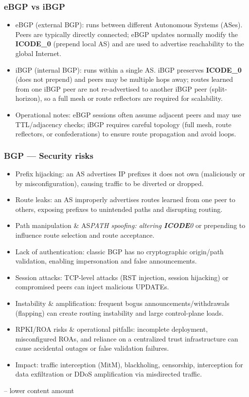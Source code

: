 \documentclass{article}
\begin{document}
\subsubsection{eBGP vs iBGP}
\begin{itemize}
  \item eBGP (external BGP): runs between different Autonomous Systems (ASes). Peers are typically directly connected; eBGP updates normally modify the \textbf{ICODE_0} (prepend local AS) and are used to advertise reachability to the global Internet.
  \item iBGP (internal BGP): runs within a single AS. iBGP preserves \textbf{ICODE_0} (does not prepend) and peers may be multiple hops away; routes learned from one iBGP peer are not re-advertised to another iBGP peer (split-horizon), so a full mesh or route reflectors are required for scalability.
  \item Operational notes: eBGP sessions often assume adjacent peers and may use TTL/adjacency checks; iBGP requires careful topology (full mesh, route reflectors, or confederations) to ensure route propagation and avoid loops.
\end{itemize}

\subsubsection{BGP — Security risks}
\begin{itemize}
  \item Prefix hijacking: an AS advertises IP prefixes it does not own (maliciously or by misconfiguration), causing traffic to be diverted or dropped.
  \item Route leaks: an AS improperly advertises routes learned from one peer to others, exposing prefixes to unintended paths and disrupting routing.
  \item Path manipulation \& AS\textit{PATH spoofing: altering \textbf{ICODE}0} or prepending to influence route selection and route acceptance.
  \item Lack of authentication: classic BGP has no cryptographic origin/path validation, enabling impersonation and false announcements.
  \item Session attacks: TCP-level attacks (RST injection, session hijacking) or compromised peers can inject malicious UPDATEs.
  \item Instability \& amplification: frequent bogus announcements/withdrawals (flapping) can create routing instability and large control-plane loads.
  \item RPKI/ROA risks \& operational pitfalls: incomplete deployment, misconfigured ROAs, and reliance on a centralized trust infrastructure can cause accidental outages or false validation failures.
  \item Impact: traffic interception (MitM), blackholing, censorship, interception for data exfiltration or DDoS amplification via misdirected traffic.
\end{itemize}
-- lower content amount
\end{document}
